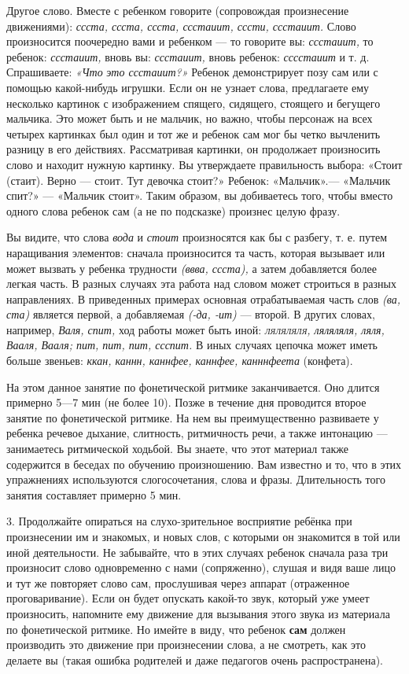 \documentclass{book}
\renewcommand{\emph}[1]{\textit{#1}}
\begin{document}
Другое слово. Вместе с ребенком говорите (сопровождая произнесение
движениями): \emph{ссста, ссста, ссста, ссстаиит, сссти, ссстаиит.}
Слово произносится поочередно вами и ребенком --- то говорите вы:
\emph{ссстаиит,} то ребенок: \emph{ссстаиит,} вновь вы: \emph{ссстаиит,}
вновь ребенок: \emph{сссстаиит} и т. д. Спрашиваете: \emph{«Что}
\emph{это ссстаиит?»} Ребенок демонстрирует позу сам или с помощью
какой-нибудь игрушки. Если он не узнает слова, предлагаете ему несколько
картинок с изображением спящего, сидящего, стоящего и бегущего мальчика.
Это может быть и не мальчик, но важно, чтобы персонаж на всех четырех
картинках был один и тот же и ребенок сам мог бы четко вычленить разницу
в его действиях. Рассматривая картинки, он продолжает произносить слово
и находит нужную картинку. Вы утверждаете правильность выбора: «Стоит
(стаит). Верно --- стоит. Тут девочка стоит?» Ребенок: «Мальчик».---
«Мальчик спит?» --- «Мальчик стоит». Таким образом, вы добиваетесь того,
чтобы вместо одного слова ребенок сам (а не по подсказке) произнес целую
фразу.

Вы видите, что слова \emph{вода} и \emph{стоит} произносятся как бы с
разбегу, т. е. путем наращивания элементов: сначала произносится та
часть, которая вызывает или может вызвать у ребенка трудности
\emph{(ввва, ссста),} а затем добавляется более легкая часть. В разных
случаях эта работа над словом может строиться в разных направлениях. В
приведенных примерах основная отрабатываемая часть слов \emph{(ва, ста)}
является первой, а добавляемая \emph{(-да, -ит)} --- второй. В других
словах, например, \emph{Валя, спит,} ход работы может быть иной:
\emph{\textsc{ляляляля,} ляляляля, ляля, Вааля, Вааля; пит, пит, пит,
ссспит.} В иных случаях цепочка может иметь больше звеньев: \emph{ккан,
каннн, каннфее, каннфее, канннфеета} (конфета).

На этом данное занятие по фонетической ритмике заканчивается. Оно длится
примерно 5---7 мин (не более 10). Позже в течение дня проводится второе
занятие по фонетической ритмике. На нем вы преимущественно развиваете у
ребенка речевое дыхание, слитность, ритмичность речи, а также интонацию
--- занимаетесь ритмической ходьбой. Вы знаете, что этот материал также
содержится в беседах по обучению произношению. Вам известно и то, что в
этих упражнениях используются слогосочетания, слова и фразы.
Длительность того занятия составляет примерно 5 мин.

3. Продолжайте опираться на слухо-зрительное восприятие ребёнка при
произнесении им и знакомых, и новых слов, с которыми он знакомится в той
или иной деятельности. Не забывайте, что в этих случаях ребенок сначала
раза три произносит слово одновременно с нами (сопряженно), слушая и
видя ваше лицо и тут же повторяет слово сам, прослушивая через аппарат
(отраженное проговаривание). Если он будет опускать какой-то звук,
который уже умеет произносить, напомните ему движение для вызывания
этого звука из материала по фонетической ритмике. Но имейте в виду, что
ребенок \textbf{сам} должен производить это движение при произнесении
слова, а не смотреть, как это делаете вы (такая ошибка родителей и даже
педагогов очень распространена).
\end{document}
